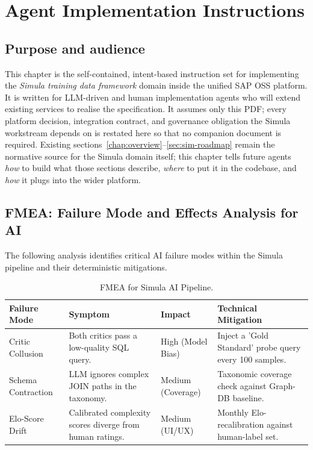 \chapter{Agent Implementation Instructions}
\label{ch:agent-impl}

\section{Purpose and audience}
This chapter is the self-contained, intent-based instruction set for
implementing the \emph{Simula training data framework} domain inside
the unified SAP OSS platform. It is written for LLM-driven and human
implementation agents who will extend existing services to realise
the specification. It assumes only this PDF; every platform
decision, integration contract, and governance obligation the Simula
workstream depends on is restated here so that no companion document
is required. Existing sections~\ref{chap:overview}--\ref{sec:sim-roadmap}
remain the normative source for the Simula domain itself; this
chapter tells future agents \emph{how} to build what those sections
describe, \emph{where} to put it in the codebase, and \emph{how} it
plugs into the wider platform.



\section{FMEA: Failure Mode and Effects Analysis for AI}
\label{sec:fmea-ai}

The following analysis identifies critical AI failure modes within the Simula pipeline and their deterministic mitigations.

\begin{table}[htbp]
\centering
\footnotesize
\caption{FMEA for Simula AI Pipeline.}
\label{tab:simula-fmea}
\begin{tabularx}{\textwidth}{@{}l X X X@{}}
\toprule
\textbf{Failure Mode} & \textbf{Symptom} & \textbf{Impact} & \textbf{Technical Mitigation} \\
\midrule
Critic Collusion & Both critics pass a low-quality SQL query. & High (Model Bias) & Inject a 'Gold Standard' probe query every 100 samples. \\
Schema Contraction & LLM ignores complex JOIN paths in the taxonomy. & Medium (Coverage) & Taxonomic coverage check against Graph-DB baseline. \\
Elo-Score Drift & Calibrated complexity scores diverge from human ratings. & Medium (UI/UX) & Monthly Elo-recalibration against human-label set. \\
\bottomrule
\end{tabularx}
\end{table}

